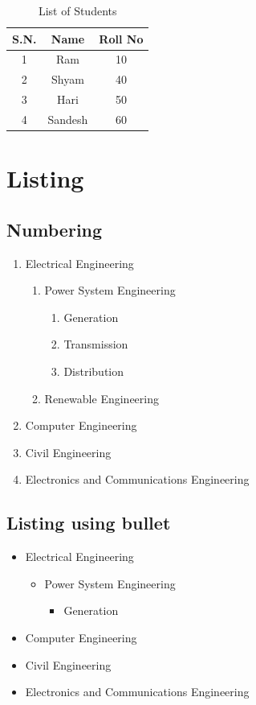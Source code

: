 \documentclass[12pt]{report}
\begin{document}
\begin{table}[!hbt]
\centering
\caption{List of Students}

\begin{tabular}{|c|c|c|}
\hline 
S.N. & Name & Roll No \\ 
\hline 
1 & Ram  & 10 \\ 
\hline 
2 & Shyam & 40 \\ 
\hline 
3 & Hari & 50 \\ 
\hline 
4 & Sandesh & 60 \\ 
\hline 
\end{tabular} 
\end{table}

\chapter{Listing}
\section{Numbering}
\begin{enumerate}
\item Electrical Engineering
   \begin{enumerate}
   \item Power System Engineering
     \begin{enumerate}
     \item Generation
     \item Transmission
     \item Distribution
     \end{enumerate}
     
   \item Renewable Engineering
   
   \end{enumerate}

\item Computer Engineering
\item Civil Engineering
\item Electronics and Communications Engineering
\end{enumerate}


\section{Listing using bullet}
\begin{itemize}
\item Electrical Engineering
  \begin{itemize}
  \item Power System Engineering
    \begin{itemize}
    \item Generation
    \end{itemize}
  \end{itemize}

\item Computer Engineering
\item Civil Engineering
\item Electronics and Communications Engineering
\end{itemize}
\end{document}
